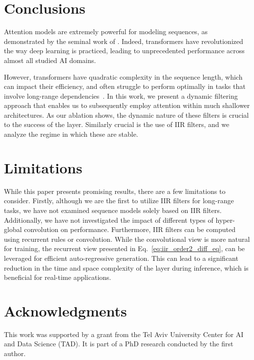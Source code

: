 \documentclass[11pt]{article}
\begin{document}
\section{Conclusions}



Attention models are extremely powerful for modeling sequences, as demonstrated by the seminal work of \citet{attention_is_all_u_need}. Indeed, transformers have revolutionized the way deep learning is practiced, leading to unprecedented performance across almost all studied AI domains. 

However, transformers have quadratic complexity in the sequence length, which can impact their efficiency, and often struggle to perform optimally in tasks that involve long-range dependencies~\cite{tay2020long}. In this work, we present a dynamic filtering approach that enables us to subsequently employ attention within much shallower architectures. As our ablation shows, the dynamic nature of these filters is crucial to the success of the layer. Similarly crucial is the use of IIR filters, and we analyze the regime in which these are stable. 

\section{Limitations}

While this paper presents promising results, there are a few limitations to consider. Firstly, although we are the first to utilize IIR filters for long-range tasks, we have not examined sequence models solely based on IIR filters. Additionally, we have not investigated the impact of different types of hyper-global convolution on performance. Furthermore, IIR filters can be computed using recurrent rules or convolution. While the convolutional view is more natural for training, the recurrent view presented in Eq.~\ref{eq:iir_order2_diff_eq}, can be leveraged for efficient auto-regressive generation. This can lead to a significant reduction in the time and space complexity of the layer during inference, which is beneficial for real-time applications.

\section{Acknowledgments}
This work was supported by a grant from the Tel Aviv University Center for AI and Data Science (TAD). It is part of a PhD research conducted by the first author.
\end{document}
